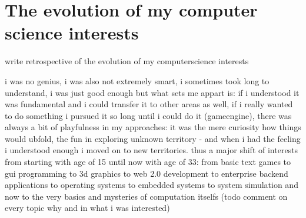 \section{The evolution of my computer science interests}
\label{app:cs_interests}

write retrospective of the evolution of my computerscience interests

i was no genius, i was also not extremely smart, i sometimes took long to understand, i was just good enough but what sets me appart is: if i understood it was fundamental and i could transfer it to other areas as well, if i really wanted to do something i pursued it so long until i could do it (gameengine), there was always a bit of playfulness  in my approaches: it was the mere curiosity how things would ubfold, the fun in exploring unknown territory - and when i had the feeling i understood enough i moved on to new territories. thus a major shift of interests from starting with age of 15 until now with age of 33: from basic text games to gui programming to 3d graphics to web 2.0 development to enterprise backend applications to operating systems to  embedded systems to system simulation and now to the very basics and mysteries of computation itselfs (todo comment on every topic why and in what i was interested)